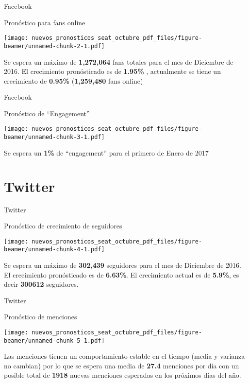 \documentclass[ignorenonframetext,]{beamer}
\begin{document}
\begin{frame}{Facebook}

\begin{block}{Pronóstico para fans online}

\texttt{[image: nuevos\_pronosticos\_seat\_octubre\_pdf\_files/figure-beamer/unnamed-chunk-2-1.pdf]}

Se espera un máximo de \textbf{1,272,064} fans totales para el mes de
Diciembre de 2016. El crecimiento pronósticado es de \textbf{1.95\%} ,
actualmente se tiene un crecimiento de \textbf{0.95\%}
(\textbf{1,259,480} fans online)

\end{block}

\end{frame}

\begin{frame}{Facebook}

\begin{block}{Pronóstico de ``Engagement''}

\texttt{[image: nuevos\_pronosticos\_seat\_octubre\_pdf\_files/figure-beamer/unnamed-chunk-3-1.pdf]}

Se espera un \textbf{1\%} de ``engagement'' para el primero de Enero de
2017

\end{block}

\end{frame}

\section{Twitter}\label{twitter}

\begin{frame}{Twitter}

\begin{block}{Pronóstico de crecimiento de seguidores}

\texttt{[image: nuevos\_pronosticos\_seat\_octubre\_pdf\_files/figure-beamer/unnamed-chunk-4-1.pdf]}

Se espera un máximo de \textbf{302,439} seguidores para el mes de
Diciembre de 2016. El crecimiento pronósticado es de \textbf{6.63\%}. El
crecimiento actual es de \textbf{5.9\%}, es decir \textbf{300612}
seguidores.

\end{block}

\end{frame}

\begin{frame}{Twitter}

\begin{block}{Pronóstico de menciones}

\texttt{[image: nuevos\_pronosticos\_seat\_octubre\_pdf\_files/figure-beamer/unnamed-chunk-5-1.pdf]}

\tiny
Las menciones tienen un comportamiento estable en el tiempo (media y
varianza no cambian) por lo que se espera una media de \textbf{27.4}
menciones por día con un posible total de \textbf{1918} nuevas menciones
esperadas en los próximos días del año.

\end{block}

\end{frame}
\end{document}
